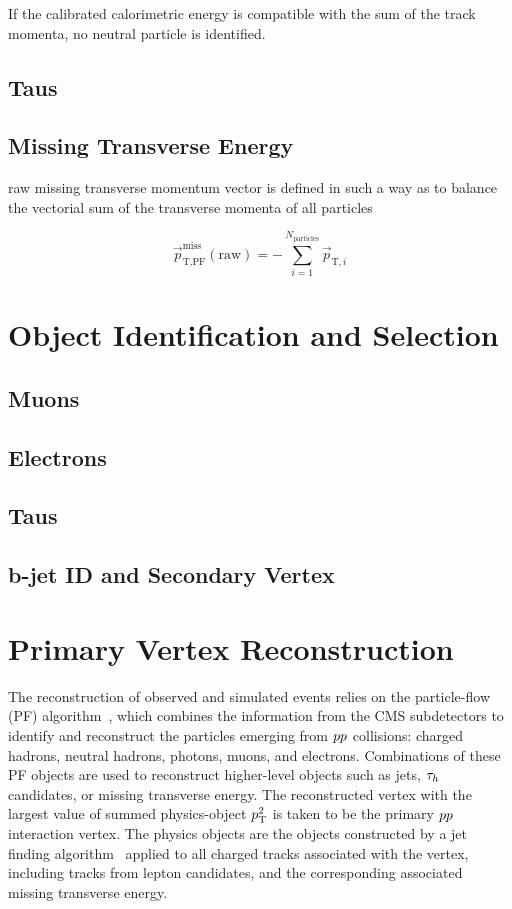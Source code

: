 If the calibrated calorimetric energy is compatible with the sum of the track momenta, no neutral particle is identified.



\subsection{Taus}
\subsection{Missing Transverse Energy}

raw missing transverse momentum vector is defined in such a way as to balance the vectorial sum of the transverse momenta of all particles

\begin{equation}
\vec{p}^{\text{miss}}_{\text{T,PF}}(\text{raw}) = - \sum^{N_{\text{particles}}}_{i=1} \vec{p}_{\text{T},i}
\end{equation}

\pagebreak
\section{Object Identification and Selection}
\subsection{Muons}
\subsection{Electrons}
\subsection{Taus}
\subsection{b-jet ID and Secondary Vertex}

\section{Primary Vertex Reconstruction}




The reconstruction of observed and simulated events relies on the particle-flow (PF) algorithm~\cite{Sirunyan:2017ulk},
which combines the information from the CMS subdetectors to identify
and reconstruct the particles emerging from $pp$ collisions:
charged hadrons, neutral hadrons, photons, muons, and electrons.
Combinations of these PF objects are used to reconstruct
higher-level objects such as jets, $\tau_{h}$ candidates, or
missing transverse energy.
The reconstructed vertex with the largest value of summed physics-object $p_\mathrm{T}^2$ is taken to be the primary $pp$ interaction vertex. The physics objects are the objects constructed by a jet finding algorithm~\cite{Cacciari:2008gp,Cacciari:2011ma} applied to all charged tracks associated with the vertex, including tracks from lepton candidates, and the corresponding associated missing transverse energy.

